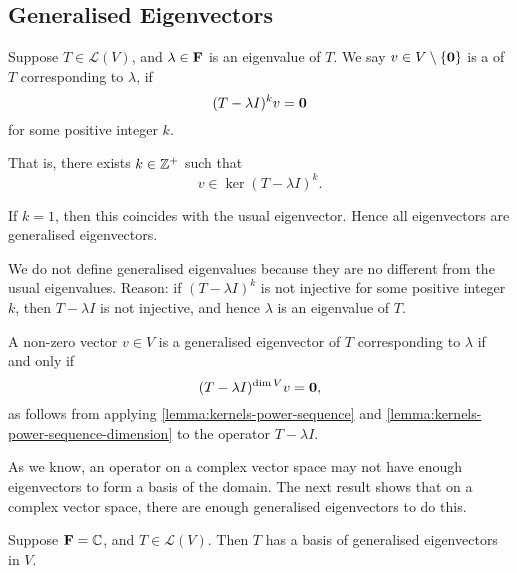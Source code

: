 \subsection{Generalised Eigenvectors}
\begin{definition}
Suppose $T\in\mathcal{L}(V)$, and $\lambda\in\mathbf F$ is an eigenvalue of $T$. We say $v\in V\setminus\{\vb{0}\}$ is a  of $T$ corresponding to $\lambda$, if
\[(T-\lambda I)^k v=\vb{0}\]
for some positive integer $k$.
\end{definition}

That is, there exists $k\in\mathbb Z^+$ such that
\[v\in\ker(T-\lambda I)^k.\]

\begin{remark}
If $k=1$, then this coincides with the usual eigenvector. Hence all eigenvectors are generalised eigenvectors.
\end{remark}

\begin{remark}
We do not define generalised eigenvalues because they are no different from the usual eigenvalues. Reason: if $(T-\lambda I)^k$ is not injective for some positive integer $k$, then $T-\lambda I$ is not injective, and hence $\lambda$ is an eigenvalue of $T$.
\end{remark}

A non-zero vector $v\in V$ is a generalised eigenvector of $T$ corresponding to $\lambda$ if and only if
\[(T-\lambda I)^{\dim V}v=\vb{0},\]
as follows from applying \ref{lemma:kernels-power-sequence} and \ref{lemma:kernels-power-sequence-dimension} to the operator $T-\lambda I$.

As we know, an operator on a complex vector space may not have enough eigenvectors to form a basis of the domain. 
The next result shows that on a complex vector space, there are enough generalised eigenvectors to do this.

\begin{proposition}
Suppose $\mathbf F=\mathbb C$, and $T\in\mathcal{L}(V)$. Then $T$ has a basis of generalised eigenvectors in $V$.
\end{proposition}

